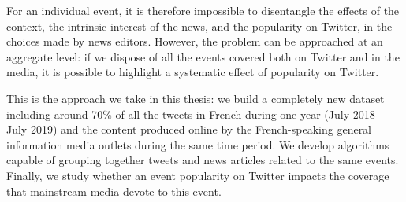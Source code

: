 For an individual event, it is therefore impossible to disentangle the effects of the context, the intrinsic interest of the news, and the popularity on Twitter, in the choices made by news editors. However, the problem can be approached at an aggregate level: if we dispose of all the events covered both on Twitter and in the media, it is possible to highlight a systematic effect of popularity on Twitter. 

This is the approach we take in this thesis: we build a completely
new dataset including around 70\% of all the tweets in French during one year (July 2018 - July 2019) and the content produced online by the French-speaking general information media outlets during the same time period. We develop algorithms capable of grouping together tweets and news articles related to the same events. Finally, we study whether an event popularity on Twitter impacts the coverage that mainstream media devote to this event.


